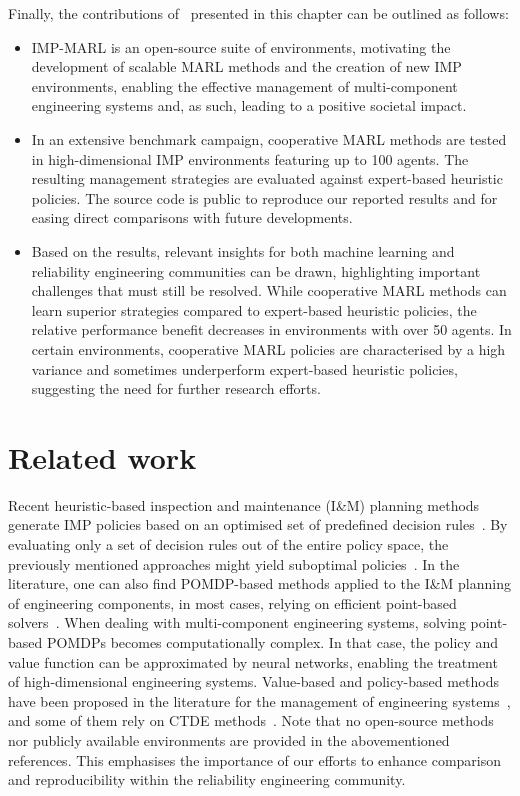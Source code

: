 Finally, the contributions of~\citep{leroy2023impmarl} presented in this chapter can be outlined as follows:
\begin{itemize}
  \item IMP-MARL is an open-source suite of environments, motivating the development of scalable MARL methods and the creation of new IMP environments, enabling the effective management of multi-component engineering systems and, as such, leading to a positive societal impact.
  \item In an extensive benchmark campaign, cooperative MARL methods are tested in high-dimensional IMP environments featuring up to 100 agents.
  The resulting management strategies are evaluated against expert-based heuristic policies.
  The source code is public to reproduce our reported results and for easing direct comparisons with future developments.
  \item Based on the results, relevant insights for both machine learning and reliability engineering communities can be drawn, highlighting important challenges that must still be resolved.
  While cooperative MARL methods can learn superior strategies compared to expert-based heuristic policies, the relative performance benefit decreases in environments with over 50 agents.
  In certain environments, cooperative MARL policies are characterised by a high variance and sometimes underperform expert-based heuristic policies, suggesting the need for further research efforts.
\end{itemize}


\section{Related work} \label{sec:ch5_relatedwork}
Recent heuristic-based inspection and maintenance (I\&M) planning methods generate IMP policies based on an optimised set of predefined decision rules~\citep{LuqueDBN2019, Bismut2019OptimalDete}.
By evaluating only a set of decision rules out of the entire policy space, the previously mentioned approaches might yield suboptimal policies~\citep{morato2022optimal}.
In the literature, one can also find POMDP-based methods applied to the I\&M planning of engineering components, in most cases, relying on efficient point-based solvers~\citep{Papakonstantinou2014Part1, Papakonstantinou2014Part2, morato2022optimal}. 
When dealing with multi-component engineering systems, solving point-based POMDPs becomes computationally complex.
In that case, the policy and value function can be approximated by neural networks, enabling the treatment of high-dimensional engineering systems.
Value-based and policy-based methods have been proposed in the literature for the management of engineering systems~\citep{Andriotis2019ManagingLearning,andriotis2021deep,morato2022syst}, and some of them rely on CTDE methods~\citep{nguyen2022weighted, saifullah2022deep}.
Note that no open-source methods nor publicly available environments are provided in the abovementioned references.
This emphasises the importance of our efforts to enhance comparison and reproducibility within the reliability engineering community.



